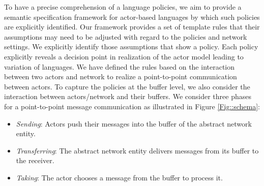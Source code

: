 To have a precise comprehension of a language policies, we aim to provide a semantic specification framework for actor-based languages by which such policies are %
explicitly identified. Our framework provides a set of template rules that their assumptions may need to be adjusted with regard to the policies and network settings. We explicitly identify those assumptions that show a policy. Each policy explicitly reveals a decision point in realization of the actor model leading to variation of languages. We have defined the rules based on the interaction between two actors and network to realize a point-to-point communication between actors. To capture the policies at the buffer level, we also consider the interaction between actors/network and their buffers. We consider three phases for a point-to-point message communication as illustrated in Figure \ref{Fig::schema}: 
\begin{itemize}
\item\textit{Sending}: Actors push their messages into the buffer of the abstract network entity. %

\item\textit{Transferring}: The abstract network entity delivers messages from its buffer to the receiver. %


\item\textit{Taking}: The actor chooses a message from the buffer to process it. %
	
\end{itemize}

